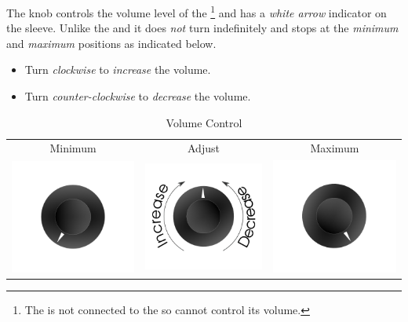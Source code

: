 The  knob controls the volume level of the \footnote{ The
 is not connected to the  so cannot control its volume.}
and has a \textit{white arrow} indicator on the sleeve.  Unlike the  and
 it does \textit{not} turn indefinitely and stops at the
\textit{minimum} and \textit{maximum} positions as indicated below.

\begin{itemize}
  \item Turn \textit{clockwise} to \textit{increase} the volume.
  \item Turn \textit{counter-clockwise} to \textit{decrease} the volume.
\end{itemize}

\begin{table}[H]
\centering
\begin{tabular}{ c c c }
  Minimum & Adjust & Maximum \\
  \includegraphics{images/volume_lo.png}
    & \includegraphics{images/volume.png}
    & \includegraphics{images/volume_hi.png}
\end{tabular}
\caption{Volume Control}
\end{table}

